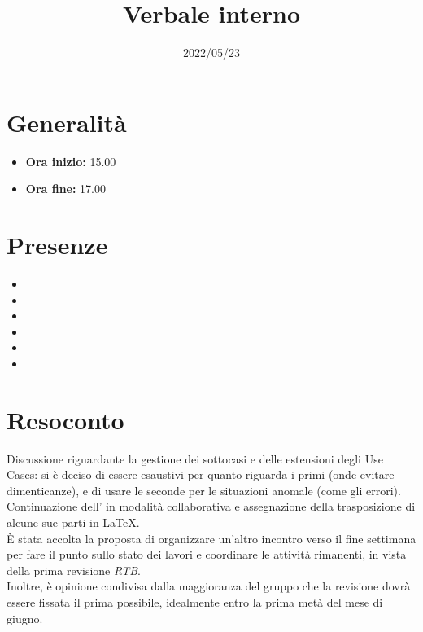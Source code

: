 \documentclass{classes/base}
\title{Verbale interno}
\date{2022/05/23}
\author{\marcov}
\renewcommand{\maketitle}{
    
}
\begin{document}
    \maketitle

    \section*{Generalità}
    \begin{itemize}
        \item \textbf{Ora inizio:} 15.00
        \item \textbf{Ora fine:} 17.00
    \end{itemize}

    \section*{Presenze}
    \begin{itemize}
        
        \item \angela
        \item \marcob
        \item \tommaso
        \item \matteo
        \item \marcov
        \item \giulio
    \end{itemize}
    
    \section*{Resoconto}
    Discussione riguardante la gestione dei sottocasi e delle estensioni degli Use Cases: si è deciso di essere esaustivi per quanto riguarda i primi (onde evitare dimenticanze), e di usare le seconde per le situazioni anomale (come gli errori). \\
    Continuazione dell'\AdR{} in modalità collaborativa e assegnazione della trasposizione di alcune sue parti in \LaTeX.\\
    È stata accolta la proposta di organizzare un'altro incontro verso il fine settimana per fare il punto sullo stato dei lavori e coordinare le attività rimanenti, in vista della prima revisione \textit{RTB}.\\
    Inoltre, è opinione condivisa dalla maggioranza del gruppo che la revisione dovrà essere fissata il prima possibile, idealmente entro la prima metà del mese di giugno.
\end{document}
